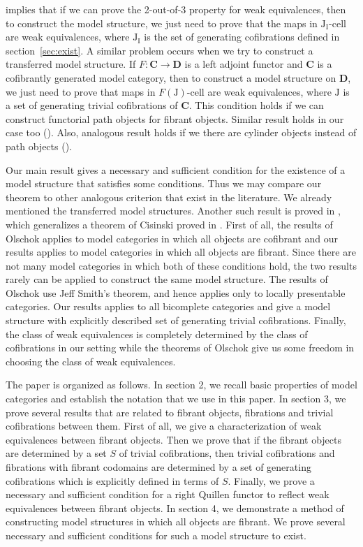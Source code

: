 \documentclass{tac}
\theoremstyle{definition}
\newcommand{\cat}[1]{\mathbf{#1}}
\newcommand{\C}{\cat{C}}
\newcommand{\D}{\cat{D}}
\newcommand{\I}{\mathrm{I}}
\newcommand{\J}{\mathrm{J}}
\newcommand{\class}[2]{#1\text{-}\mathrm{#2}}
\newcommand{\Icell}[1][\I]{\class{#1}{cell}}
\newcommand{\Jcell}[1][]{\Icell[\J#1]}
\begin{document}
 implies that if we can prove the 2-out-of-3 property for weak equivalences,
then to construct the model structure, we just need to prove that the maps in $\Jcell[_\I]$ are weak equivalences,
where $\J_\I$ is the set of generating cofibrations defined in section~\ref{sec:exist}.
A similar problem occurs when we try to construct a transferred model structure.
If $F : \C \to \D$ is a left adjoint functor and $\C$ is a cofibrantly generated model category, then to construct a model structure on $\D$,
we just need to prove that maps in $\Icell[F(\J)]$ are weak equivalences, where $\J$ is a set of generating trivial cofibrations of $\C$.
This condition holds if we can construct functorial path objects for fibrant objects.
Similar result holds in our case too ().
Also, analogous result holds if we there are cylinder objects instead of path objects ().

Our main result gives a necessary and sufficient condition for the existence of a model structure that satisfies some conditions.
Thus we may compare our theorem to other analogous criterion that exist in the literature.
We already mentioned the transferred model structures.
Another such result is proved in \cite{olschok}, which generalizes a theorem of Cisinski proved in \cite{cisinski}.
First of all, the results of Olschok applies to model categories in which all objects are cofibrant and our results applies to model categories in which all objects are fibrant.
Since there are not many model categories in which both of these conditions hold, the two results rarely can be applied to construct the same model structure.
The results of Olschok use Jeff Smith's theorem, and hence applies only to locally presentable categories.
Our results applies to all bicomplete categories and give a model structure with explicitly described set of generating trivial cofibrations.
Finally, the class of weak equivalences is completely determined by the class of cofibrations in our setting
while the theorems of Olschok give us some freedom in choosing the class of weak equivalences.

The paper is organized as follows.
In section 2, we recall basic properties of model categories and establish the notation that we use in this paper.
In section 3, we prove several results that are related to fibrant objects, fibrations and trivial cofibrations between them.
First of all, we give a characterization of weak equivalences between fibrant objects.
Then we prove that if the fibrant objects are determined by a set $S$ of trivial cofibrations,
then trivial cofibrations and fibrations with fibrant codomains are determined by a set of generating cofibrations which is explicitly defined in terms of $S$.
Finally, we prove a necessary and sufficient condition for a right Quillen functor to reflect weak equivalences between fibrant objects.
In section 4, we demonstrate a method of constructing model structures in which all objects are fibrant.
We prove several necessary and sufficient conditions for such a model structure to exist.
\end{document}
